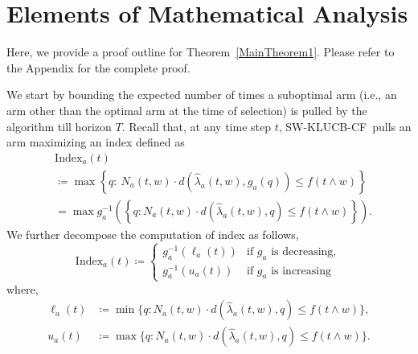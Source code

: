\documentclass[letterpaper]{article} %
\newcommand{\defined}{\coloneqq}
\newcommand{\SWKLUCBCF}{\textsc{SW-KLUCB-CF}}
\newcommand{\windowsize}{w}
\begin{document}
\section{Elements of Mathematical Analysis}
Here, we provide a proof outline for Theorem~\ref{MainTheorem1}. Please refer to the Appendix for the complete proof.

We start by bounding the expected number of times a suboptimal arm (i.e., an arm other than the optimal arm at the time of selection) is pulled by the algorithm till horizon $T$. Recall that, at any time step $t$, \SWKLUCBCF \ pulls an arm maximizing an index defined as
\begin{align*}
    & \mathrm{Index}_a(t) \\
    &\defined \max \left\{ q:\  N_a(t, \windowsize)\cdot{}d\left(\hat{\lambda}_a(t, \windowsize), g_a(q)\right) \leq f\left(t \wedge \windowsize\right) \right\} \\
%
    &= \max g_a^{-1}\left( \left\{q: N_a(t, \windowsize)\cdot{}d\left(\hat{\lambda}_a(t, \windowsize), q\right) \leq f\left(t \wedge \windowsize\right)\right\} \right).
\end{align*}
%
We further decompose the computation of index as follows,
$$\mathrm{Index}_a(t) \defined
    \begin{cases}
      g_a^{-1}({\ell_a(t)}) & \text{if } g_a \text{ is decreasing}, \\
      g_a^{-1}({u_a(t)}) & \text{if } g_a \text{ is increasing}
    \end{cases}
$$
where,
\begin{align*}
\ell_a(t)  &\defined  \min \Big\{q: N_a(t, \windowsize)\cdot{}d\left(\hat{\lambda}_a(t, \windowsize), q\right) \leq f\left( t \wedge \windowsize \right)\Big\}, \\
u_a(t)  &\defined  \max \Big\{q: N_a(t, \windowsize)\cdot{}d\left(\hat{\lambda}_a(t, \windowsize), q\right) \leq f\left( t \wedge\windowsize \right) \Big\}.
\end{align*}
\end{document}
